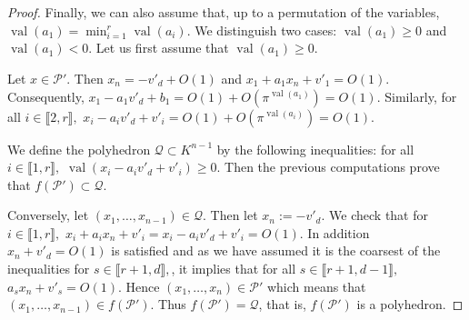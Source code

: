 \documentclass[sigconf]{acmart}
\newcommand{\PP}{\mathcal{P}}
\newcommand{\Qc}{\mathcal{Q}}
\DeclareMathOperator{\val}{val}
\begin{document}
\begin{proof}
Finally, we can also assume that, up to a permutation of the variables, $\val(a_1)= \min_{i=1}^{r} \val(a_i).$
We distinguish two cases: $\val(a_1) \geq 0$ and $\val(a_1)<0.$
Let us first assume that $\val(a_1) \geq 0$.

Let $x \in \PP'$.
Then $x_n=-v'_d+O(1)$
and $x_1+a_1 x_n+v'_1=O(1).$
Consequently, $x_1-a_1 v'_d +b_1=O(1)+O(\pi^{\val(a_1)})=O(1).$
Similarly, for all $i \in \llbracket 2,r \rrbracket,$
$x_i-a_i v'_d+v'_i=O(1)+O(\pi^{\val(a_i)})=O(1).$

We define the polyhedron $\Qc \subset K^{n-1}$ by the following inequalities:
 for all $i \in \llbracket 1,r \rrbracket,$
$\val(x_i-a_iv'_d+v'_i) \geq 0$. Then the previous computations prove that $f(\PP')\subset \Qc.$

Conversely, let $(x_1,\dots,x_{n-1}) \in \Qc.$
Then let $x_n := -v'_d.$
We check that for $i \in \llbracket 1,r \rrbracket,$
$x_i+a_ix_n+v'_i=x_i-a_iv'_d+v'_i=O(1).$
In addition $x_n+v'_d=O(1)$ is satisfied
and as we have assumed it is the coarsest of the inequalities
for $s \in \llbracket r+1,d \rrbracket,$, it implies that 
for all $s \in \llbracket r+1,d-1 \rrbracket,$
$a_s x_n+v'_s=O(1)$.
Hence $(x_1,\dots,x_n) \in \PP'$
which means that $(x_1,\dots,x_{n-1}) \in f(\PP').$
Thus $f(\PP')= \Qc$, that is, $f(\PP')$ is a polyhedron.


\end{proof}
\end{document}
